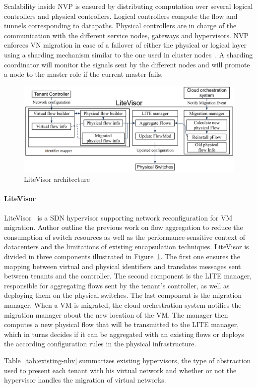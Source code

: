 Scalability inside NVP is ensured by distributing computation over several logical controllers and physical controllers. Logical controllers compute the flow and tunnels corresponding to datapaths. Physical controllers are in charge of the communication with the different service nodes, gateways and hypervisors.
NVP enforces VN migration in case of a failover of either the physical or logical layer using a sharding mechanism similar to the one used in cluster nodes~\cite{sharding}. 
A sharding coordinator will monitor the signals sent by the different nodes and will promote a node to the master role if the current master fails.


\begin{figure}[ht]
    \centering
    \includegraphics[scale=0.5]{figures/litevisor.pdf}
    \caption{LiteVisor architecture~\cite{Litevisor-Yang2018}}
    \label{fig:litevisor}
\end{figure}

\paragraph{LiteVisor}
LiteVisor~\cite{Litevisor-Yang2018} is a SDN hypervisor supporting network reconfiguration for VM migration.
Author outline the previous work on flow aggregation to reduce the consumption of switch resources as well as the performance-sensitive context of datacenters and the limitations of existing encapsulation techniques.
LiteVisor is divided in three components illustrated in Figure~\ref{fig:litevisor}. The first one ensures the mapping between virtual and physical identifiers and translates messages sent between tenants and the controller.
The second component is the LITE manager, responsible for aggregating flows sent by the tenant's controller, as well as deploying them on the physical switches. 
The last component is the migration manager. When a VM is migrated, the cloud orchestration system notifies the migration manager about the new location of the VM. The manager then computes a new physical flow that will be transmitted to the LITE manager, which in turns decides if it can be aggregated with an existing flows or deploys the according configuration rules in the physical infrastructure.

Table~\ref{tab:existing-nhv} summarizes existing hypervisors, the type of abstraction used to present each tenant with his virtual network and whether or not the hypervisor handles the migration of virtual networks.